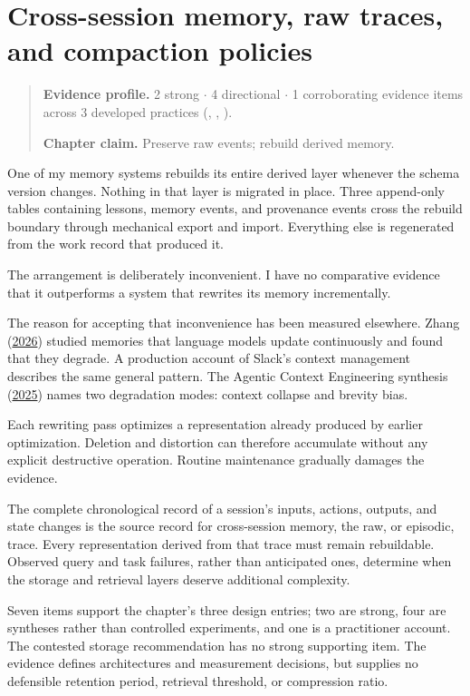\chapter{Cross-session memory, raw traces, and compaction policies}
\label{ch15-cross-session-memory-raw-traces-compaction}
\begin{quote}
\textbf{Evidence profile.} 2 strong \(\cdot\) 4 directional \(\cdot\) 1 corroborating evidence items across 3 developed practices (, , ).

\textbf{Chapter claim.} Preserve raw events; rebuild derived memory.
\end{quote}

One of my memory systems rebuilds its entire derived layer whenever the schema version changes. Nothing in that layer is migrated in place. Three append-only tables containing lessons, memory events, and provenance events cross the rebuild boundary through mechanical export and import. Everything else is regenerated from the work record that produced it.

The arrangement is deliberately inconvenient. I have no comparative evidence that it outperforms a system that rewrites its memory incrementally.

The reason for accepting that inconvenience has been measured elsewhere. Zhang (\href{https://arxiv.org/abs/2605.12978}{2026}) studied memories that language models update continuously and found that they degrade. A production account of Slack's context management describes the same general pattern. The Agentic Context Engineering synthesis (\href{https://arxiv.org/abs/2510.04618}{2025}) names two degradation modes: context collapse and brevity bias.

Each rewriting pass optimizes a representation already produced by earlier optimization. Deletion and distortion can therefore accumulate without any explicit destructive operation. Routine maintenance gradually damages the evidence.

The complete chronological record of a session's inputs, actions, outputs, and state changes is the source record for cross-session memory, the raw, or episodic, trace. Every representation derived from that trace must remain rebuildable. Observed query and task failures, rather than anticipated ones, determine when the storage and retrieval layers deserve additional complexity.

Seven items support the chapter's three design entries; two are strong, four are syntheses rather than controlled experiments, and one is a practitioner account. The contested storage recommendation has no strong supporting item. The evidence defines architectures and measurement decisions, but supplies no defensible retention period, retrieval threshold, or compression ratio.

